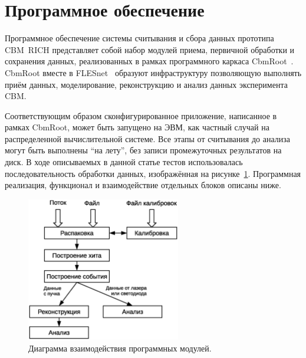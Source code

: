 \section{Программное обеспечение}\label{section:secSoft}

Программное обеспечение системы считывания и сбора данных прототипа CBM~RICH представляет собой набор модулей приема, первичной обработки и сохранения данных, реализованных в рамках программного каркаса CbmRoot~\cite{CBMROOT}. CbmRoot вместе в FLESnet~\cite{FLESnet} образуют инфраструктуру позволяющую выполнять приём данных, моделирование, реконструкцию и анализ данных эксперимента CBM.

Соответствующим образом сконфигурированное приложение, написанное в рамках CbmRoot, может быть запущено на ЭВМ, как частный случай на распределенной вычислительной системе. Все этапы от считывания до анализа могут быть выполнены ``на лету'', без записи промежуточных результатов на диск. В ходе описываемых в данной статье тестов использовалась последовательность обработки данных, изображённая на рисунке~\ref{fig:SoftDiag}. Программная реализация, функционал и взаимодействие отдельных блоков описаны ниже.

\begin{figure}
\includegraphics[width=0.6\textwidth]{pictures/13_Software_diagram.eps}
\caption{Диаграмма взаимодействия программных модулей.}
\label{fig:SoftDiag}
\end{figure}

